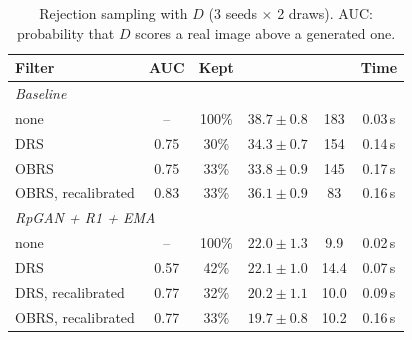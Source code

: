 \begin{table}[t]
\centering
\small
\setlength{\tabcolsep}{3.2pt}
\caption{Rejection sampling with $D$ (3 seeds $\times$ 2 draws). AUC: probability that $D$ scores a real image above a generated one.}
\label{tab:rejection}
\begin{tabular}{lccccc}
\toprule
Filter & AUC & Kept & \finc{} & \fcnn{} & Time\\
\midrule
\multicolumn{6}{l}{\emph{Baseline}}\\
none & -- & 100\% & $38.7\pm0.8$ & 183 & 0.03\,s\\
DRS & 0.75 & 30\% & $34.3\pm0.7$ & 154 & 0.14\,s\\
OBRS & 0.75 & 33\% & $\mathbf{33.8\pm0.9}$ & 145 & 0.17\,s\\
OBRS, recalibrated & 0.83 & 33\% & $36.1\pm0.9$ & 83 & 0.16\,s\\
\midrule
\multicolumn{6}{l}{\emph{RpGAN + R1 + EMA}}\\
none & -- & 100\% & $22.0\pm1.3$ & 9.9 & 0.02\,s\\
DRS & 0.57 & 42\% & $22.1\pm1.0$ & 14.4 & 0.07\,s\\
DRS, recalibrated & 0.77 & 32\% & $20.2\pm1.1$ & 10.0 & 0.09\,s\\
OBRS, recalibrated & 0.77 & 33\% & $\mathbf{19.7\pm0.8}$ & 10.2 & 0.16\,s\\
\bottomrule
\end{tabular}
\end{table}
